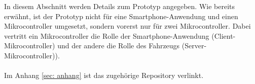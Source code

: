 In diesem Abschnitt werden Details zum Prototyp angegeben. Wie bereits erwähnt, ist der Prototyp nicht für eine Smartphone-Anwendung und einen Mikrocontroller umgesetzt, sondern vorerst nur für zwei Mikrocontroller. Dabei vertritt ein Mikrocontroller die Rolle der Smartphone-Anwendung (Client-Mikrocontroller) und der andere die Rolle des Fahrzeugs (Server-Mikrocontroller)).
\\\\
Im Anhang \ref{sec: anhang} ist das zugehörige Repository verlinkt.